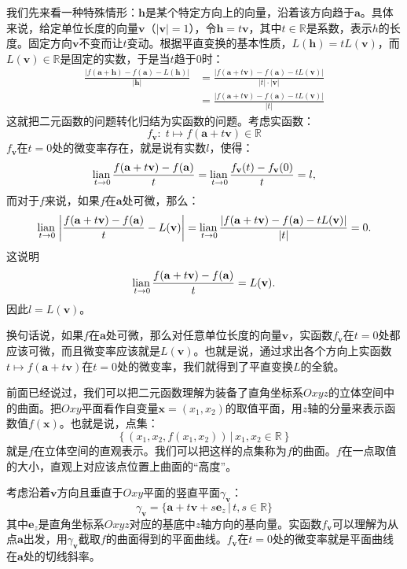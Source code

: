 \documentclass[12pt,UTF8]{ctexbook}
\begin{document}
我们先来看一种特殊情形：$\mathbf{h}$是某个特定方向上的向量，沿着该方向趋于$\mathbf{a}$。具体来说，给定单位长度的向量$\mathbf{v}$（$|\mathbf{v}| = 1$），令$\mathbf{h} = t\mathbf{v}$，其中$t\in\mathbb{R}$是系数，表示$h$的长度。固定方向$\mathbf{v}$不变而让$t$变动。根据平直变换的基本性质，$L(\mathbf{h}) = tL(\mathbf{v})$，而$L(\mathbf{v})\in\mathbb{R}$是固定的实数，于是当$t$趋于$0$时：
\begin{align*}
    \frac{\left|f(\mathbf{a} + \mathbf{h}) - f(\mathbf{a}) - L(\mathbf{h})\right|}{|\mathbf{h}|} &= \frac{\left|f(\mathbf{a} + t\mathbf{v}) - f(\mathbf{a}) - tL(\mathbf{v})\right|}{|t|\cdot|\mathbf{v}|} \\ 
    &= \frac{\left|f(\mathbf{a} + t\mathbf{v}) - f(\mathbf{a}) - tL(\mathbf{v})\right|}{|t|}
\end{align*}
这就把二元函数的问题转化归结为实函数的问题。考虑实函数：
$$ f_{\mathbf{v}} : \;t\mapsto f(\mathbf{a} + t\mathbf{v}) \in \mathbb{R}$$
$ f_{\mathbf{v}}$在$t=0$处的微变率存在，就是说有实数$l$，使得：
$$ \underset{t\to 0}{\operatorname{lian}\,} \frac{f(\mathbf{a} + t\mathbf{v}) - f(\mathbf{a})}{t} = \underset{t\to 0}{\operatorname{lian}\,} \frac{f_{\mathbf{v}}(t) - f_{\mathbf{v}}(0)}{t} = l, $$
而对于$f$来说，如果$f$在$\mathbf{a}$处可微，那么：
$$ \underset{t\to 0}{\operatorname{lian}\,} \left|\frac{f(\mathbf{a} + t\mathbf{v}) - f(\mathbf{a})}{t} - L(\mathbf{v}) \right|= \underset{t\to 0}{\operatorname{lian}\,} \frac{\left|f(\mathbf{a} + t\mathbf{v}) - f(\mathbf{a}) - tL(\mathbf{v})\right|}{|t|} = 0.$$
这说明
$$ \underset{t\to 0}{\operatorname{lian}\,} \frac{f(\mathbf{a} + t\mathbf{v}) - f(\mathbf{a})}{t} = L(\mathbf{v}).$$
因此$l = L(\mathbf{v})$。

换句话说，如果$f$在$\mathbf{a}$处可微，那么对任意单位长度的向量$\mathbf{v}$，实函数$ f_{\mathbf{v}}$在$t=0$处都应该可微，而且微变率应该就是$L(\mathbf{v})$。也就是说，通过求出各个方向上实函数$ t\mapsto f(\mathbf{a} + t\mathbf{v})$在$t=0$处的微变率，我们就得到了平直变换$L$的全貌。

前面已经说过，我们可以把二元函数理解为装备了直角坐标系$Oxyz$的立体空间中的曲面。把$Oxy$平面看作自变量$\mathbf{x} = (x_1, x_2)$的取值平面，用$z$轴的分量来表示函数值$f(\mathbf{x})$。也就是说，点集：
$$\left\{(x_1, x_2, f(x_1, x_2)) \, \big| \, x_1, x_2 \in \mathbb{R} \right\}$$
就是$f$在立体空间的直观表示。我们可以把这样的点集称为$f$的曲面。$f$在一点取值的大小，直观上对应该点位置上曲面的“高度”。

考虑沿着$\mathbf{v}$方向且垂直于$Oxy$平面的竖直平面$\gamma_{\mathbf{v}}$：
$$\gamma_{\mathbf{v}} = \{\mathbf{a} + t\mathbf{v} + s\mathbf{e}_z \, | \, t, s \in \mathbb{R}\}$$
其中$\mathbf{e}_z$是直角坐标系$Oxyz$对应的基底中$z$轴方向的基向量。实函数$f_{\mathbf{v}}$可以理解为从点$\mathbf{a}$出发，用$\gamma_{\mathbf{v}}$截取$f$的曲面得到的平面曲线。$ f_{\mathbf{v}}$在$t=0$处的微变率就是平面曲线在$\mathbf{a}$处的切线斜率。
\end{document}
